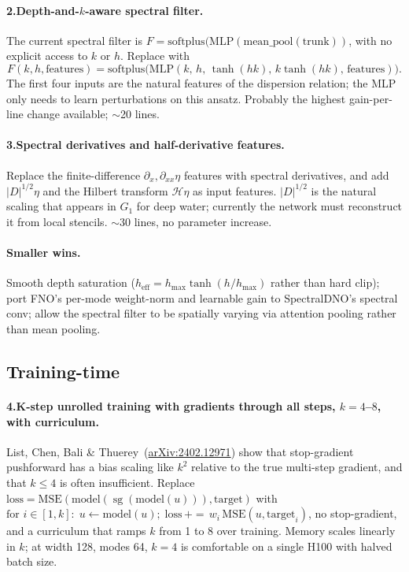 \documentclass[11pt,letterpaper]{article}
\newcommand{\sgrad}{\operatorname{sg}}
\begin{document}
\paragraph{2.\;Depth-and-$k$-aware spectral filter.}
The current spectral filter is
$F = \mathrm{softplus}(\mathrm{MLP}(\mathrm{mean\_pool}(\text{trunk}))$,
with no explicit access to $k$ or $h$. Replace with
\[
  F(k,h,\text{features}) = \mathrm{softplus}\!\bigl(\mathrm{MLP}(k,\,h,\,
    \tanh(hk),\, k\tanh(hk),\,\text{features})\bigr).
\]
The first four inputs are the natural features of the dispersion
relation; the MLP only needs to learn perturbations on this ansatz.
Probably the highest gain-per-line change available; $\sim$20 lines.

\paragraph{3.\;Spectral derivatives and half-derivative features.}
Replace the finite-difference $\partial_{x},\partial_{xx}\eta$ features
with spectral derivatives, and add $|D|^{1/2}\eta$ and the Hilbert
transform $\mathcal{H}\eta$ as input features. $|D|^{1/2}$ is the
natural scaling that appears in $G_{1}$ for deep water; currently the
network must reconstruct it from local stencils. $\sim$30 lines, no
parameter increase.

\paragraph{Smaller wins.}
Smooth depth saturation ($h_{\mathrm{eff}} = h_{\max}\tanh(h/h_{\max})$
rather than hard clip); port FNO's per-mode weight-norm and learnable
gain to SpectralDNO's spectral conv; allow the spectral filter to be
spatially varying via attention pooling rather than mean pooling.

\subsection{Training-time}

\paragraph{4.\;K-step unrolled training with gradients through all steps,
$k=4$--$8$, with curriculum.}
List, Chen, Bali \& Thuerey~(\href{https://arxiv.org/abs/2402.12971}{arXiv:2402.12971})
show that stop-gradient pushforward has a bias scaling like $k^{2}$
relative to the true multi-step gradient, and that $k\leq 4$ is often
insufficient. Replace
\(
\text{loss} = \mathrm{MSE}(\text{model}(\sgrad(\text{model}(u))), \text{target})
\)
with
\(
\text{for } i\in[1,k]:\; u \leftarrow \text{model}(u);\;
\text{loss}\,{+}{=}\,w_{i}\,\mathrm{MSE}(u, \text{target}_{i})
\),
no stop-gradient, and a curriculum that ramps $k$ from 1 to 8 over
training. Memory scales linearly in $k$; at width 128, modes 64, $k=4$
is comfortable on a single H100 with halved batch size.
\end{document}
